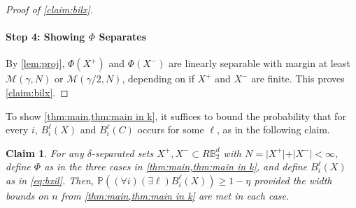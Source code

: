 \documentclass[aoap]{imsart}
\numberwithin{equation}{section}
\newtheorem{claim}[theorem]{Claim}
\theoremstyle{definition}
\theoremstyle{remark}
\numberwithin{equation}{section}
\newcommand{\0}{\mathbf{0}}
\newcommand{\1}{\mathbf{1}}
\renewcommand{\P}{\mathbb{P}}
\newcommand{\B}{\mathbb{B}}
\numberwithin{equation}{section}
\begin{document}
\begin{proof}[Proof of \cref{claim:bilx}]
\paragraph{Step 4: Showing $\Phi$ Separates}
By \cref{lem:proj}, $\Phi(X^+)$ and $\Phi(X^-)$ are linearly separable with margin at least $\mathcal{M}(\gamma, N)$ or $\mathcal{M}(\gamma/2, N)$, depending on if $X^+$ and $X^-$ are finite. This proves \cref{claim:bilx}.
\end{proof} 

To show \cref{thm:main,thm:main in k}, it suffices to bound the probability that for every $i$, $B_i^\ell(X)$ and $B_i^\ell(C)$ occurs for some $\ell$, as in the following claim.

\begin{claim}\label{claim:bil prob}
For any $\delta$-separated sets $X^+, X^-\subset R\B_2^d$ with $N= \vert X^+\vert +\vert X^-\vert <\infty$, define $\Phi$ as in the three cases in \cref{thm:main,thm:main in k}, and define
$B_i^\ell(X)$ as in \eqref{eq:bxil}. Then, $\P\left((\forall i)(\exists \ell)B_{i}^{\ell}(X)\right)\geq 1-\eta$ provided the width bounds on $n$ from \cref{thm:main,thm:main in k} are met in each case.
\end{claim}
\end{document}
